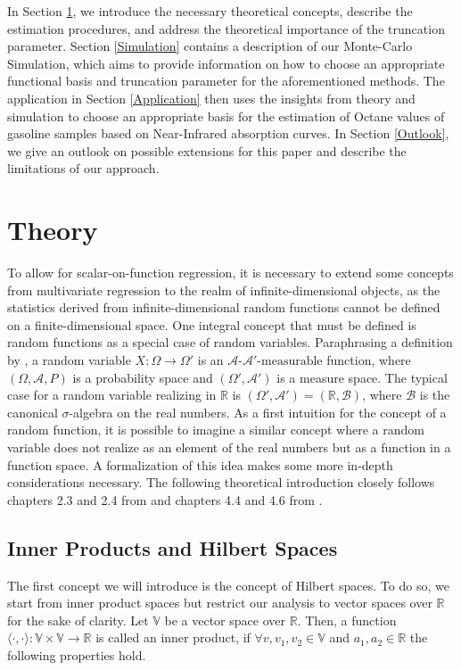 \documentclass[11pt,twoside,a4paper]{article}
\begin{document}
	In Section \ref{Theory}, we introduce the necessary theoretical concepts, describe the estimation procedures, and address the theoretical importance of the truncation parameter. Section \ref{Simulation} contains a description of our Monte-Carlo Simulation, which aims to provide information on how to choose an appropriate functional basis and truncation parameter for the aforementioned methods. The application in Section \ref{Application} then uses the insights from theory and simulation to choose an appropriate basis for the estimation of Octane values of gasoline samples based on Near-Infrared absorption curves. In Section \ref{Outlook}, we give an outlook on possible extensions for this paper and describe the limitations of our approach.

	\section{Theory}\label{Theory}
	To allow for scalar-on-function regression, it is necessary to extend some concepts from multivariate regression to the realm of infinite-dimensional objects, as the statistics derived from infinite-dimensional random functions cannot be defined on a finite-dimensional space. One integral concept that must be defined is random functions as a special case of random variables. Paraphrasing a definition by \cite{bauer_wahrscheinlichkeitstheorie_2020}, a random variable $X:\Omega \rightarrow \Omega'$ is an $\mathcal{A} \text{-} \mathcal{A'} \text{-measurable}$ function, where $(\Omega, \mathcal{A}, P)$ is a probability space and $(\Omega', \mathcal{A'})$ is a measure space. 
	The typical case for a random variable realizing in $\mathbb{R}$ is $(\Omega', \mathcal{A'}) = (\mathbb{R}, \mathcal{B})$, where $\mathcal{B}$ is the canonical $\sigma$-algebra on the real numbers. As a first intuition for the concept of a random function, it is possible to imagine a similar concept where a random variable does not realize as an element of the real numbers but as a function in a function space. A formalization of this idea makes some more in-depth considerations necessary. The following theoretical introduction closely follows chapters 2.3 and 2.4 from \cite{hsing_theoretical_2015} and chapters 4.4 and 4.6 from \cite{kokoszka_introduction_2017}. 
	
	\subsection{Inner Products and Hilbert Spaces}
	The first concept we will introduce is the concept of Hilbert spaces. To do so, we start from inner product spaces but restrict our analysis to vector spaces over $\mathbb{R}$ for the sake of clarity. Let $\mathbb{V}$ be a vector space over $\mathbb{R}$.  Then, a function $\langle \cdot, \cdot \rangle : \mathbb{V} \times  \mathbb{V} \rightarrow \mathbb{R}$ is called an inner product, if $\forall v, v_1, v_2 \in \mathbb{V}$ and $a_1, a_2 \in \mathbb{R}$ the following properties hold.
	
\end{document}
